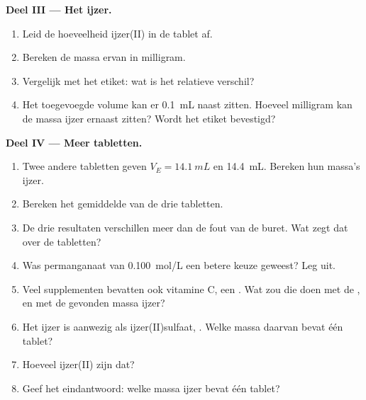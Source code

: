 \begin{problem}
\medskip
\noindent\textbf{Deel III --- Het ijzer.}
\begin{enumerate}[resume]
  \item Leid de hoeveelheid ijzer(II) in de tablet af.
  \item Bereken de massa ervan in milligram.
  \item Vergelijk met het etiket: wat is het relatieve verschil?
  \item Het toegevoegde volume kan er \qty{0.1}{mL} naast zitten. Hoeveel
        milligram kan de massa ijzer ernaast zitten? Wordt het etiket
        bevestigd?
\end{enumerate}

\medskip
\noindent\textbf{Deel IV --- Meer tabletten.}
\begin{enumerate}[resume]
  \item Twee andere tabletten geven $V_E = \qty{14.1}{mL}$ en
        \qty{14.4}{mL}. Bereken hun massa's ijzer.
  \item Bereken het gemiddelde van de drie tabletten.
  \item De drie resultaten verschillen meer dan de fout van de buret.
        Wat zegt dat over de tabletten?
  \item Was permanganaat van \qty{0.100}{mol/L} een betere keuze geweest?
        Leg uit.
  \item Veel supplementen bevatten ook vitamine C, een . Wat zou
        die doen met de , en met de gevonden massa ijzer?
  \item Het ijzer is aanwezig als ijzer(II)sulfaat, . Welke
        massa daarvan bevat één tablet?
  \item Hoeveel ijzer(II) zijn dat?
  \item Geef het eindantwoord: welke massa ijzer bevat één tablet?
\end{enumerate}
\end{problem}

